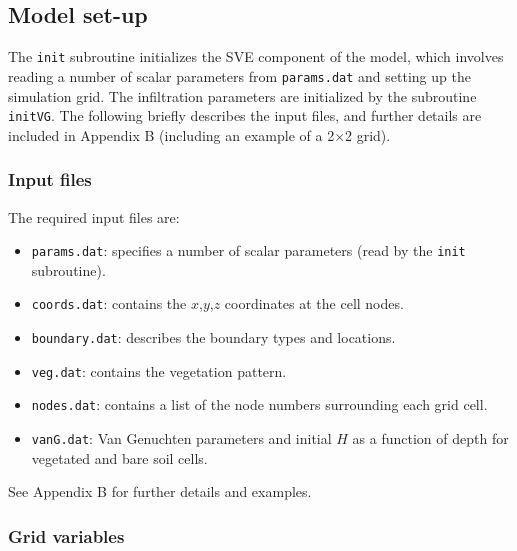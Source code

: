 \documentclass{article}
\newcommand{\code}[1]{\texttt{#1}}
\begin{document}
\subsection{Model set-up}
\label{SVEinit}
	
The \code{init} subroutine initializes the SVE component of the model,  which involves reading a number of scalar parameters from  \code{params.dat} and setting up the simulation grid.
 The infiltration parameters are initialized by the subroutine \code{initVG}.  The following briefly describes the input files, and further details are included in Appendix B (including an  example of a  2$\times$2 grid).
  
\subsubsection*{Input files}

The required input files are:

\begin{itemize}

	\item \code{params.dat}:  specifies a number of scalar parameters (read by the \code{init} subroutine).  

	\item \code{coords.dat}: contains the $x$,$y$,$z$ coordinates at the cell nodes.

	\item \code{boundary.dat}: describes the boundary types and locations.

	\item \code{veg.dat}: contains the vegetation pattern.

	\item \code{nodes.dat}: contains a list of the node numbers surrounding each grid cell.

	\item \code{vanG.dat}: Van Genuchten parameters and initial $H$ as a function of depth for vegetated and bare soil cells. 

\end{itemize}

See Appendix B for further details and examples.



\subsubsection*{Grid variables}
\end{document}
